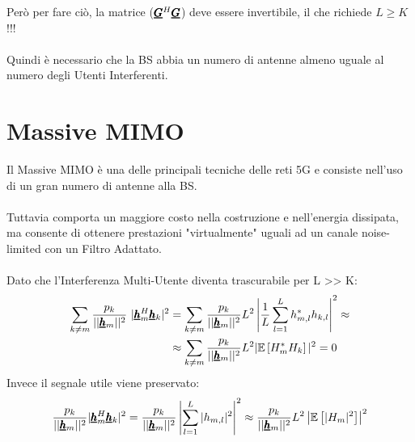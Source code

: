 Però per fare ciò, la matrice ($\pmb{\underline{G}}^H\pmb{\underline{G}}$) deve essere invertibile, il che richiede $L \geq K$!!!\\ \\
Quindi è necessario che la BS abbia un numero di antenne almeno uguale al numero degli Utenti Interferenti.

\section{Massive MIMO}
Il Massive MIMO è una delle principali tecniche delle reti 5G e consiste nell'uso di un gran numero di antenne alla BS.\\ \\
Tuttavia comporta un maggiore costo nella costruzione e nell'energia dissipata, ma consente di ottenere prestazioni "virtualmente" uguali ad un canale noise-limited con un Filtro Adattato.\\ \\
Dato che l'Interferenza Multi-Utente diventa trascurabile per L >> K:
\begin{equation*}
\begin{aligned}
        \sum_{k\neq m} \frac{p_k}{||\vc{h}_m||^2} \ |\vc{h}_m^H\vc{h}_k|^2 &= \sum_{k\neq m} \frac{p_k}{||\vc{h}_m||^2} L^2 \left|\frac{1}{L}\sum_{l=1}^L h_{m,l}^* h_{k,l} \right|^2 \approx \\
        &\approx  \sum_{k\neq m} \frac{p_k}{||\vc{h}_m||^2} L^2 |\av{H_m^* H_k}|^2 = 0
\end{aligned}
\end{equation*}
Invece il segnale utile viene preservato:
\begin{equation*}
    \frac{p_k}{||\pmb{\underline{h}}_m||^2}|\pmb{\underline{h}}_m^H\pmb{\underline{h}}_k|^2 =  \frac{p_k}{||\pmb{\underline{h}}_m||^2} \left|\sum_{l=1}^L |h_{m,l}|^2\right|^2 \approx   \frac{p_k}{||\pmb{\underline{h}}_m||^2} L^2 \left|\mathbb{E}\left[|H_m|^2\right] \right|^2
\end{equation*}